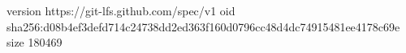 version https://git-lfs.github.com/spec/v1
oid sha256:d08b4ef3defd714c24738dd2ed363f160d0796cc48d4dc74915481ee4178c69e
size 180469
